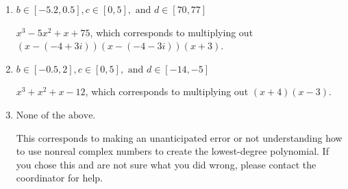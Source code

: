 \documentclass{extbook}[14pt]
\begin{document}
\begin{enumerate}
{\begin{enumerate}[label=\Alph*.]
* $x^{3} +5 x^{2} +x -75$, which is the correct option.
\item \( b \in [-5.2, 0.5], c \in [0, 5], \text{ and } d \in [70, 77] \)

$x^{3} -5 x^{2} +x + 75$, which corresponds to multiplying out $(x-(-4 + 3 i))(x-(-4 - 3 i))(x + 3)$.
\item \( b \in [-0.5, 2], c \in [0, 5], \text{ and } d \in [-14, -5] \)

$x^{3} + x^{2} +x -12$, which corresponds to multiplying out $(x + 4)(x -3)$.
\item \( \text{None of the above.} \)

This corresponds to making an unanticipated error or not understanding how to use nonreal complex numbers to create the lowest-degree polynomial. If you chose this and are not sure what you did wrong, please contact the coordinator for help.
\end{enumerate}

}
\end{enumerate}
\end{document}

